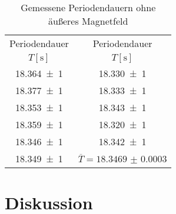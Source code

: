       \begin{table}[h]
        \begin{tabular}{|c||c|}
          \hline
          Periodendauer & Periodendauer \\ 
          $T[\si{\second}]$ & $T[\si{\second}]$\\
          \hline \hline
          \num{18,364(1)} & \num{18,330(1)}\\[1ex] \hline   
          \num{18,377(1)} & \num{18,333(1)}\\[1ex] \hline 
          \num{18,353(1)} & \num{18,343(1)}\\[1ex] \hline  
          \num{18,359(1)} & \num{18,320(1)}\\[1ex] \hline  
          \num{18,346(1)} & \num{18,342(1)}\\[1ex] \hline  
          \num{18,349(1)} & $\overline{T} = \num{18.3469(3)}$\\[1ex] \hline
    
    
        \end{tabular}
        \centering
        \caption{Gemessene Periodendauern ohne äußeres Magnetfeld}
        \label{Tab1}
      \end{table}
      
  


  
  \section{Diskussion}
  
  



